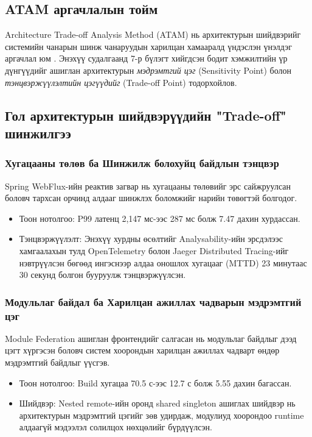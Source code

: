 \subsection{ATAM аргачлалын тойм}

Architecture Trade-off Analysis Method (ATAM) нь архитектурын шийдвэрийг системийн чанарын шинж чанаруудын харилцан хамааралд үндэслэн үнэлдэг аргачлал юм \cite{Kazman2000}. Энэхүү судалгаанд 7-р бүлэгт хийгдсэн бодит хэмжилтийн үр дүнгүүдийг ашиглан архитектурын \textit{мэдрэмтгий цэг} (Sensitivity Point) болон \textit{тэнцвэржүүлэлтийн цэгүүдийг} (Trade-off Point) тодорхойлов.

\subsection{Гол архитектурын шийдвэрүүдийн "Trade-off" шинжилгээ}

\subsubsection{Хугацааны төлөв ба Шинжилж болохуйц байдлын тэнцвэр}

\hspace*{0.6cm} Spring WebFlux-ийн реактив загвар нь хугацааны төлөвийг эрс сайжруулсан боловч тархсан орчинд алдааг шинжлэх боломжийг нарийн төвөгтэй болгодог. 
\begin{itemize}
    \item Тоон нотолгоо: P99 латенц 2,147 мс-ээс 287 мс болж 7.47 дахин хурдассан.
    \item Тэнцвэржүүлэлт: Энэхүү хурдны өсөлтийг Analysability-ийн эрсдэлээс хамгаалахын тулд OpenTelemetry болон Jaeger Distributed Tracing-ийг нэвтрүүлсэн бөгөөд ингэснээр алдаа оношлох хугацааг (MTTD) 23 минутаас 30 секунд болгон бууруулж тэнцвэржүүлсэн.
\end{itemize}

\subsubsection{Модульлаг байдал ба Харилцан ажиллах чадварын мэдрэмтгий цэг}

\hspace*{0.6cm}Module Federation ашиглан фронтендийг салгасан нь модульлаг байдлыг дээд цэгт хүргэсэн боловч систем хоорондын харилцан ажиллах чадварт өндөр мэдрэмтгий байдлыг үүсгэв.
\begin{itemize}
    \item Тоон нотолгоо: Build хугацаа 70.5 с-ээс 12.7 с болж 5.55 дахин багассан. 
    \item Шийдвэр: Nested remote-ийн оронд shared singleton ашиглах шийдвэр нь архитектурын мэдрэмтгий цэгийг зөв удирдаж, модулиуд хоорондоо runtime алдаагүй мэдээлэл солилцох нөхцөлийг бүрдүүлсэн.
\end{itemize}

